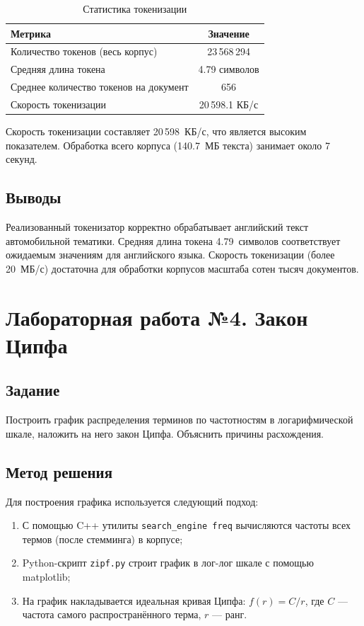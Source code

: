 \documentclass[a4paper,12pt]{article}
\begin{document}
\begin{table}[H]
\centering
\begin{tabular}{lc}
\toprule
\textbf{Метрика} & \textbf{Значение} \\
\midrule
Количество токенов (весь корпус) & 23\,568\,294 \\
Средняя длина токена & 4.79 символов \\
Среднее количество токенов на документ & 656 \\
Скорость токенизации & 20\,598.1 КБ/с \\
\bottomrule
\end{tabular}
\caption{Статистика токенизации}
\label{tab:tokenization_stats}
\end{table}

Скорость токенизации составляет 20\,598~КБ/с, что является высоким показателем. 
Обработка всего корпуса (140.7~МБ текста) занимает около 7 секунд.

\subsection{Выводы}
Реализованный токенизатор корректно обрабатывает английский текст автомобильной тематики. 
Средняя длина токена 4.79~символов соответствует ожидаемым значениям для английского языка. 
Скорость токенизации (более 20~МБ/с) достаточна для обработки корпусов масштаба 
сотен тысяч документов.

\newpage

\section{Лабораторная работа №4. Закон Ципфа}

\subsection{Задание}
Построить график распределения терминов по частотностям в логарифмической шкале, наложить 
на него закон Ципфа. Объяснить причины расхождения.

\subsection{Метод решения}

Для построения графика используется следующий подход:
\begin{enumerate}
    \item С помощью C++ утилиты \texttt{search\_engine freq} вычисляются частоты всех термов 
    (после стемминга) в корпусе;
    \item Python-скрипт \texttt{zipf.py} строит график в лог-лог шкале с помощью matplotlib;
    \item На график накладывается идеальная кривая Ципфа: $f(r) = C / r$, где $C$ --- 
    частота самого распространённого терма, $r$ --- ранг.
\end{enumerate}
\end{document}
